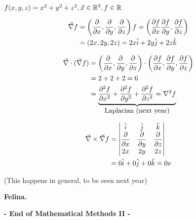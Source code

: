 \documentclass[twoside]{scrartcl}
\begin{document}
\begin{example}
	$f(x,y,z) = x^2 + y^2 + z^2, \vec{x} \in\mathbb{R}^3, f \in\mathbb{R}$
	
	\[
\begin{aligned}
  \vec{\nabla}f &= \left(\frac{\partial}{\partial x}, \frac{\partial}{\partial y}, \frac{\partial}{\partial z}\right)f =  \left(\frac{\partial f}{\partial x}\frac{\partial f}{\partial y}, \frac{\partial f}{\partial z}\right)\\
  &= (2x,2y,2z) = 2x\hat{i} + 2y\hat{j} + 2z\hat{k}
\end{aligned}
\]

\[
\begin{aligned}
  \vec{\nabla}\cdot(\vec{\nabla}f) &= \left(\frac{\partial}{\partial x}, \frac{\partial}{\partial y}, \frac{\partial}{\partial z}\right) \cdot \left(\frac{\partial f}{\partial x}, \frac{\partial f}{\partial y}, \frac{\partial f}{\partial z}\right)\\
  &= 2 + 2 + 2 = 6\\
  &= \underbrace{\frac{\partial ^2f}{\partial x^2} + \frac{\partial^2f}{\partial y^2} + \frac{\partial^2f}{\partial z^2} = \nabla^2f}_{\mbox{Laplacian (next year)}}
\end{aligned}
\]

\[
\begin{aligned}
  \vec{\nabla} \times \vec{\nabla}f &= 
  \begin{vmatrix}
 \hat{i} & \hat{j} & \hat{k}\\
 \dfrac{\partial}{\partial x} & \dfrac{\partial}{\partial y} & \dfrac{\partial}{\partial z}\\
 2x & 2y & 2z
 \end{vmatrix}\\
 &= 0\hat{i} + 0\hat{j} + 0\hat{k} = 0v
\end{aligned}
\]

(This happens in general, to be seen next year)
\end{example}









\textbf{Felina.} 


  \begin{center}
  \textsf{\textbf{- End of Mathematical Methods II -}}	
  \end{center}
  
\end{document}
